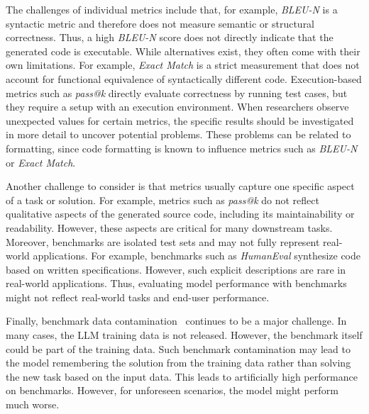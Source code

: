 The challenges of individual metrics include that, for example, \emph{BLEU-N} is a syntactic metric and therefore does not measure semantic or structural correctness.
Thus, a high \emph{BLEU-N} score does not directly indicate that the generated code is executable.
While alternatives exist, they often come with their own limitations.
For example, \emph{Exact Match} is a strict measurement that does not account for functional equivalence of syntactically different code.
Execution-based metrics such as \emph{pass@k} directly evaluate correctness by running test cases, but they require a setup with an execution environment.
When researchers observe unexpected values for certain metrics, the specific results should be investigated in more detail to uncover potential problems.
These problems can be related to formatting, since code formatting is known to influence metrics such as \emph{BLEU-N} or \emph{Exact Match}.

Another challenge to consider is that metrics usually capture one specific aspect of a task or solution.
For example, metrics such as \emph{pass@k} do not reflect qualitative aspects of the generated source code, including its maintainability or readability.
However, these aspects are critical for many downstream tasks.
Moreover, benchmarks are isolated test sets and may not fully represent real-world applications.
For example, benchmarks such as \emph{HumanEval} synthesize code based on written specifications.
However, such explicit descriptions are rare in real-world applications.
Thus, evaluating model performance with benchmarks might not reflect real-world tasks and end-user performance.

Finally, benchmark data contamination~\cite{DBLP:journals/corr/abs-2406-04244} continues to be a major challenge.
In many cases, the LLM training data is not released.
However, the benchmark itself could be part of the training data.
Such benchmark contamination may lead to the model remembering the solution from the training data rather than solving the new task based on the input data.
This leads to artificially high performance on benchmarks.
However, for unforeseen scenarios, the model might perform much worse.


